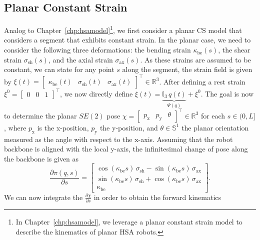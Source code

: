 \subsection{Planar Constant Strain}
Analog to Chapter~\ref{chp:hsamodel}\footnote{In Chapter~\ref{chp:hsamodel}, we leverage a planar constant strain model to describe the kinematics of planar \gls{HSA} robots.}, we first consider a planar \gls{CS} model that considers a segment that exhibits constant strain.
In the planar case, we need to consider the following three deformations: the bending strain $\kappa_\mathrm{be}(s)$, the shear strain $\sigma_\mathrm{sh}(s)$, and the axial strain $\sigma_\mathrm{ax}(s)$. As these strains are assumed to be constant, we can state for any point $s$ along the segment, the strain field is given by $\xi(t) = \begin{bmatrix}
    \kappa_\mathrm{be}(t) & \sigma_\mathrm{sh}(t) & \sigma_\mathrm{ax}(t)
\end{bmatrix}^\top \in \mathbb{R}^3$.
After defining a rest strain $\xi^0 = \begin{bmatrix}
    0 & 0 & 1
\end{bmatrix}^\top$, we now directly define $\xi(t) = \underbrace{\mathbb{I}_3 \, q(t)}_{\Psi(q)} + \xi^0$.
The goal is now to determine the planar $SE(2)$ pose $\chi = \begin{bmatrix}
    p_\mathrm{x} & p_\mathrm{y} & \theta
\end{bmatrix}^\top \in \mathbb{R}^3$ for each $s \in (0,L]$, where $p_\mathrm{x}$ is the x-position, $p_\mathrm{y}$ the y-position, and $\theta \in \mathbb{S}^1$ the planar orientation measured as the angle with respect to the x-axis.
Assuming that the robot backbone is aligned with the local y-axis, the infinitesimal change of pose along the backbone is given as
\begin{equation}
    \frac{\partial \pi(q,s)}{\partial s} = \begin{bmatrix}
        \cos(\kappa_\mathrm{be} s) \, \sigma_\mathrm{sh} - \sin(\kappa_\mathrm{be} s) \, \sigma_\mathrm{ax}\\
        \sin(\kappa_\mathrm{be} s) \, \sigma_\mathrm{sh} + \cos(\kappa_\mathrm{be} s) \, \sigma_\mathrm{ax}\\
        \kappa_\mathrm{be}
    \end{bmatrix}.
\end{equation}
We can now integrate the $\frac{\partial \chi}{\partial s}$ in order to obtain the forward kinematics
